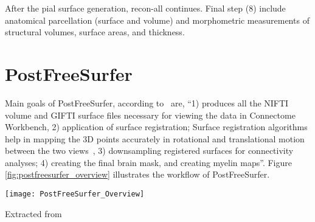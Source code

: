 
After the pial surface generation, recon-all continues. Final step (8) include anatomical parcellation (surface and volume) and morphometric measurements of structural volumes, surface areas, and thickness.

\section{PostFreeSurfer} \label{sec:PostFreeSurfer}
Main goals of PostFreeSurfer, according to~\cite{Gla13} are, ``1) 
produces all the NIFTI volume and GIFTI surface files necessary for 
viewing the data in Connectome Workbench, 2) application of surface 
registration; Surface registration algorithms help in mapping the 3D 
points accurately in rotational and translational motion between the 
two views~\cite{DBLP:journals/corr/HrgeticP13}, 3) downsampling 
registered surfaces for connectivity analyses; 4) creating the final 
brain mask, and creating myelin maps''. Figure 
\ref{fig:postfreesurfer_overview} illustrates the workflow of 
PostFreeSurfer. 

\begin{center}
  \texttt{[image: PostFreeSurfer\_Overview]}
  \label{fig:postfreesurfer_overview}
  \caption*{Extracted from \cite{Gla13}}
\end{center}

